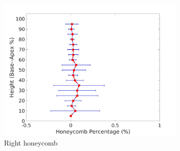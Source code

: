 \begin{figure}[H]
\begin{subfigure}{.42\linewidth}
  \includegraphics[width=\linewidth,trim={{.0\wd0} {.0\wd0} {.0\wd0} {.0\wd0}},clip]{QuantitativeAnalysis/Image/RightLungHoneycombDiseaseAgainstHeight.jpg}
  \caption{Right honeycomb}
  \label{fig:DiseaseAgainstHeight-f}
\end{subfigure}
\begin{subfigure}{.42\linewidth}%

\end{subfigure}
\end{figure}
